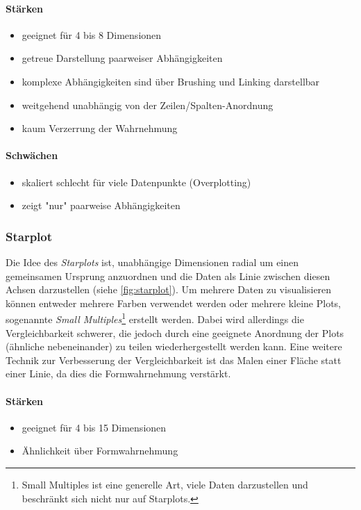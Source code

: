 				\paragraph{Stärken}
				\begin{itemize}
					\item geeignet für 4 bis 8 Dimensionen
					\item getreue Darstellung paarweiser Abhängigkeiten
					\item komplexe Abhängigkeiten sind über Brushing und Linking darstellbar
					\item weitgehend unabhängig von der Zeilen/Spalten-Anordnung
					\item kaum Verzerrung der Wahrnehmung
				\end{itemize}

				\paragraph{Schwächen}
				\begin{itemize}
					\item skaliert schlecht für viele Datenpunkte (Overplotting)
					\item zeigt "nur" paarweise Abhängigkeiten
				\end{itemize}

			\subsubsection{Starplot}
				Die Idee des \emph{Starplots} ist, unabhängige Dimensionen radial um einen gemeinsamen Ursprung anzuordnen und die Daten als Linie zwischen diesen Achsen darzustellen (siehe \autoref{fig:starplot}). Um mehrere Daten zu visualisieren können entweder mehrere Farben verwendet werden oder mehrere kleine Plots, sogenannte \emph{Small Multiples}\footnote{Small Multiples ist eine generelle Art, viele Daten darzustellen und beschränkt sich nicht nur auf Starplots.} erstellt werden. Dabei wird allerdings die Vergleichbarkeit schwerer, die jedoch durch eine geeignete Anordnung der Plots (ähnliche nebeneinander) zu teilen wiederhergestellt werden kann. Eine weitere Technik zur Verbesserung der Vergleichbarkeit ist das Malen einer Fläche statt einer Linie, da dies die Formwahrnehmung verstärkt.

				\paragraph{Stärken}
				\begin{itemize}
					\item geeignet für 4 bis 15 Dimensionen
					\item Ähnlichkeit über Formwahrnehmung
				\end{itemize}

